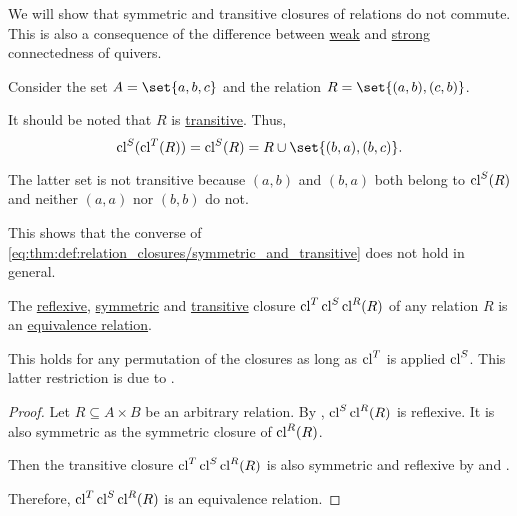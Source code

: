 \begin{example}\label{ex:thm:def:relation_closures/symmetric_and_transitive}
  We will show that symmetric and transitive closures of relations do not commute. This is also a consequence of the difference between \hyperref[def:quiver_connectedness/weak]{weak} and \hyperref[def:quiver_connectedness/strong]{strong} connectedness of quivers.

  Consider the set \( A = \set{ a, b, c } \) and the relation \( R = \set{ (a, b), (c, b) } \).

  It should be noted that \( R \) is \hyperref[def:binary_relation/transitive]{transitive}. Thus,
  \begin{equation*}
    \cl^S(\cl^T(R)) = \cl^S(R) = R \cup \set{ (b, a), (b, c) }.
  \end{equation*}

  The latter set is not transitive because \( (a, b) \) and \( (b, a) \) both belong to \( \operatorname{cl}^S(R) \) and neither \( (a, a) \) nor \( (b, b) \) do not.

  This shows that the converse of \eqref{eq:thm:def:relation_closures/symmetric_and_transitive} does not hold in general.
\end{example}

\begin{proposition}\label{thm:equivalence_closure}
  The \hyperref[def:relation_closures/reflexive]{reflexive}, \hyperref[def:relation_closures/symmetric]{symmetric} and \hyperref[def:relation_closures/transitive]{transitive} closure \( \operatorname{cl}^T \operatorname{cl}^S \operatorname{cl}^R (R) \) of any relation \( R \) is an \hyperref[def:equivalence_relation]{equivalence relation}.

  This holds for any permutation of the closures as long as \( \operatorname{cl}^T \) is applied  \( \operatorname{cl}^S \). This latter restriction is due to .
\end{proposition}
\begin{proof}
  Let \( R \subseteq A \times B \) be an arbitrary relation. By , \( \operatorname{cl}^S \operatorname{cl}^R (R) \) is reflexive. It is also symmetric as the symmetric closure of \( \operatorname{cl}^R(R) \).

  Then the transitive closure \( \operatorname{cl}^T \operatorname{cl}^S \operatorname{cl}^R (R) \) is also symmetric and reflexive by  and .

  Therefore, \( \operatorname{cl}^T \operatorname{cl}^S \operatorname{cl}^R (R) \) is an equivalence relation.
\end{proof}

